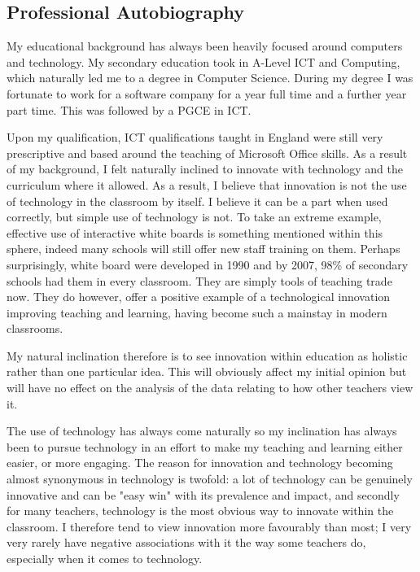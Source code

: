 \subsection{Professional Autobiography}
My educational background has always been heavily focused around computers and technology. My secondary education took in A-Level ICT and Computing, which naturally led me to a degree in Computer Science. During my degree I was fortunate to work for a software company for a year full time and a further year part time. This was followed by a PGCE in ICT.

Upon my qualification, ICT qualifications taught in England were still very prescriptive and based around the teaching of Microsoft Office skills. As a result of my background, I felt naturally inclined to innovate with technology and the curriculum where it allowed. As a result, I believe that innovation is not the use of technology in the classroom by itself. I believe it can be a part when used correctly, but simple use of technology is not. To take an extreme example, effective use of interactive white boards is something mentioned within this sphere, indeed many schools will still offer new staff training on them. Perhaps surprisingly, white board were developed in 1990 and by 2007, 98\% \cite{kitchen2008harnessing} of secondary schools had them in every classroom. They are simply tools of teaching trade now. They do however, offer a positive example of a technological innovation improving teaching and learning, having become such a mainstay in modern classrooms.

My natural inclination therefore is to see innovation within education as holistic rather than one particular idea. This will obviously affect my initial opinion but will have no effect on the analysis of the data relating to how other teachers view it.

The use of technology has always come naturally so my inclination has always been to pursue technology in an effort to make my teaching and learning either easier, or more engaging. The reason for innovation and technology becoming almost synonymous in technology is twofold: a lot of technology can be genuinely innovative and can be "easy win" with its prevalence and impact, and secondly for many teachers, technology is the most obvious way to innovate within the classroom. I therefore tend to view innovation more favourably than most; I very very rarely have negative associations with it the way some teachers do, especially when it comes to technology.

